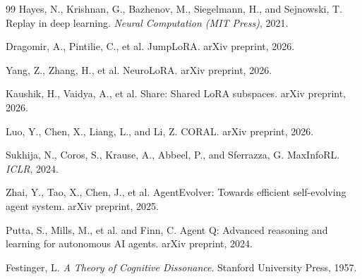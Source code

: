 \documentclass[11pt,a4paper]{article}
\begin{document}
\begin{thebibliography}{99}
Hayes, N., Krishnan, G., Bazhenov, M., Siegelmann, H., and Sejnowski, T.
Replay in deep learning.
\textit{Neural Computation (MIT Press)}, 2021.

Dragomir, A., Pintilie, C., et al.
JumpLoRA.
arXiv preprint, 2026.

Yang, Z., Zhang, H., et al.
NeuroLoRA.
arXiv preprint, 2026.

Kaushik, H., Vaidya, A., et al.
Share: Shared LoRA subspaces.
arXiv preprint, 2026.

Luo, Y., Chen, X., Liang, L., and Li, Z.
CORAL.
arXiv preprint, 2026.

Sukhija, N., Coros, S., Krause, A., Abbeel, P., and Sferrazza, G.
MaxInfoRL.
\textit{ICLR}, 2024.

Zhai, Y., Tao, X., Chen, J., et al.
AgentEvolver: Towards efficient self-evolving agent system.
arXiv preprint, 2025.

Putta, S., Mills, M., et al. and Finn, C.
Agent Q: Advanced reasoning and learning for autonomous AI agents.
arXiv preprint, 2024.

Festinger, L.
\textit{A Theory of Cognitive Dissonance}.
Stanford University Press, 1957.

\end{thebibliography}
\end{document}
